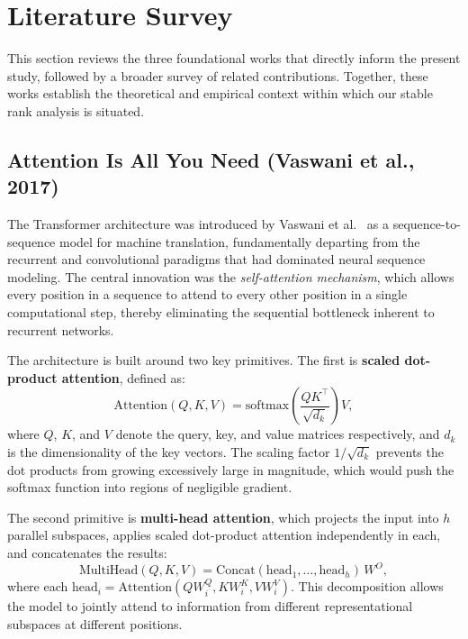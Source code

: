 \documentclass[12pt, a4paper]{article}
\begin{document}
\section{Literature Survey}

This section reviews the three foundational works that directly inform
the present study, followed by a broader survey of related contributions.
Together, these works establish the theoretical and empirical context
within which our stable rank analysis is situated.

\subsection{Attention Is All You Need (Vaswani et al., 2017)}

The Transformer architecture was introduced by Vaswani et
al.~\cite{vaswani2017} as a sequence-to-sequence model for machine
translation, fundamentally departing from the recurrent and convolutional
paradigms that had dominated neural sequence modeling. The central
innovation was the \textit{self-attention mechanism}, which allows every
position in a sequence to attend to every other position in a single
computational step, thereby eliminating the sequential bottleneck
inherent to recurrent networks.

The architecture is built around two key primitives. The first is
\textbf{scaled dot-product attention}, defined as:
\begin{equation}
    \text{Attention}(Q, K, V) = \text{softmax}\!\left(\frac{QK^\top}{\sqrt{d_k}}\right) V,
    \label{eq:sdpa}
\end{equation}
where $Q$, $K$, and $V$ denote the query, key, and value matrices
respectively, and $d_k$ is the dimensionality of the key vectors. The
scaling factor $1/\sqrt{d_k}$ prevents the dot products from growing
excessively large in magnitude, which would push the softmax function
into regions of negligible gradient.

The second primitive is \textbf{multi-head attention}, which projects the
input into $h$ parallel subspaces, applies scaled dot-product attention
independently in each, and concatenates the results:
\begin{equation}
    \text{MultiHead}(Q, K, V) = \text{Concat}(\text{head}_1, \ldots, \text{head}_h)\, W^O,
    \label{eq:mha}
\end{equation}
where each $\text{head}_i = \text{Attention}(QW_i^Q, KW_i^K, VW_i^V)$.
This decomposition allows the model to jointly attend to information from
different representational subspaces at different positions.
\end{document}
